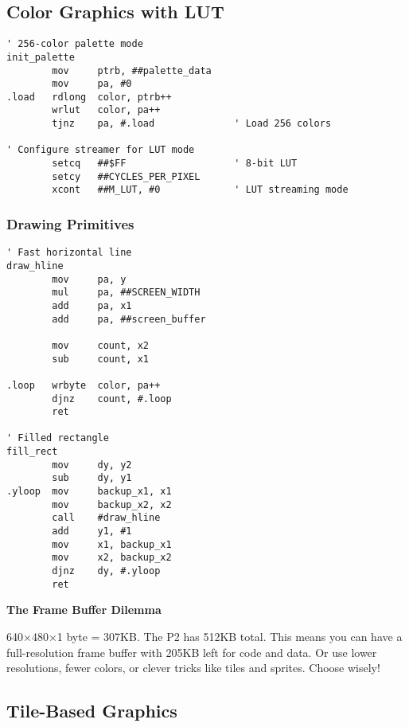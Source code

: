\documentclass[11pt]{book}
\begin{document}
\hypertarget{color-graphics-with-lut}{%
\subsection{Color Graphics with LUT}\label{color-graphics-with-lut}}

\begin{lstlisting}
' 256-color palette mode
init_palette
        mov     ptrb, ##palette_data
        mov     pa, #0
.load   rdlong  color, ptrb++
        wrlut   color, pa++
        tjnz    pa, #.load              ' Load 256 colors
        
' Configure streamer for LUT mode
        setcq   ##$FF                   ' 8-bit LUT
        setcy   ##CYCLES_PER_PIXEL
        xcont   ##M_LUT, #0             ' LUT streaming mode
\end{lstlisting}

\hypertarget{drawing-primitives}{%
\subsubsection{Drawing Primitives}\label{drawing-primitives}}

\begin{lstlisting}
' Fast horizontal line
draw_hline
        mov     pa, y
        mul     pa, ##SCREEN_WIDTH
        add     pa, x1
        add     pa, ##screen_buffer
        
        mov     count, x2
        sub     count, x1
        
.loop   wrbyte  color, pa++
        djnz    count, #.loop
        ret

' Filled rectangle
fill_rect
        mov     dy, y2
        sub     dy, y1
.yloop  mov     backup_x1, x1
        mov     backup_x2, x2
        call    #draw_hline
        add     y1, #1
        mov     x1, backup_x1
        mov     x2, backup_x2
        djnz    dy, #.yloop
        ret
\end{lstlisting}

\begin{interlude}
\textbf{The Frame Buffer Dilemma}

640×480×1 byte = 307KB. The P2 has 512KB total. This means you can have a full-resolution frame buffer with 205KB left for code and data. Or use lower resolutions, fewer colors, or clever tricks like tiles and sprites. Choose wisely!
\end{interlude}

\hypertarget{tile-based-graphics}{%
\subsection{Tile-Based Graphics}\label{tile-based-graphics}}
\end{document}
